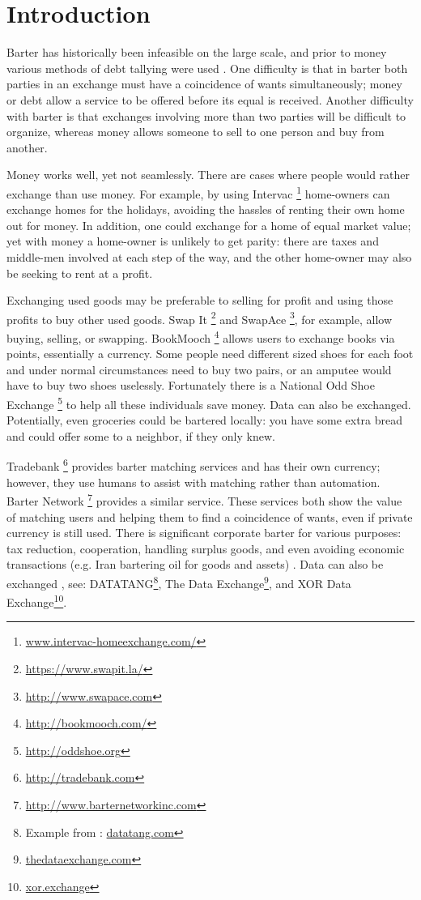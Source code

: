 \documentclass[main.tex]{subfiles}
\begin{document}
\section{Introduction}
Barter has historically been infeasible on the large scale, and prior to money various methods of debt tallying were used \cite{Gra1}. One difficulty is that in barter both parties in an exchange must have a coincidence of wants simultaneously; money or debt allow a service to be offered before its equal is received. Another difficulty with barter is that exchanges involving more than two parties will be difficult to organize, whereas money allows someone to sell to one person and buy from another.

Money works well, yet not seamlessly. There are cases where people would rather exchange than use money. For example, by using Intervac \footnote{\url{www.intervac-homeexchange.com/}} \cite{Abr1} home-owners can exchange homes for the holidays, avoiding the hassles of renting their own home out for money. In addition, one could exchange for a home of equal market value; yet with money a home-owner is unlikely to get parity: there are taxes and middle-men involved at each step of the way, and the other home-owner may also be seeking to rent at a profit.

Exchanging used goods may be preferable to selling for profit and using those profits to buy other used goods. Swap It \footnote{\url{https://www.swapit.la/}} and SwapAce \footnote{\url{http://www.swapace.com}}, for example, allow buying, selling, or swapping. BookMooch \footnote{\url{http://bookmooch.com/}} allows users to exchange books via points, essentially a currency. Some people need different sized shoes for each foot and under normal circumstances need to buy two pairs, or an amputee would have to buy two shoes uselessly. Fortunately there is a National Odd Shoe Exchange \footnote{\url{http://oddshoe.org}} to help all these individuals save money. Data can also be exchanged. Potentially, even groceries could be bartered locally: you have some extra bread and could offer some to a neighbor, if they only knew.

Tradebank \footnote{\url{http://tradebank.com}} provides barter matching services and has their own currency; however, they use humans to assist with matching rather than automation. Barter Network \footnote{\url{http://www.barternetworkinc.com}} provides a similar service. These services both show the value of matching users and helping them to find a coincidence of wants, even if private currency is still used. There is significant corporate barter for various purposes: tax reduction, cooperation, handling surplus goods, and even avoiding economic transactions (e.g. Iran bartering oil for goods and assets) \cite{art:str}. Data can also be exchanged \cite{art:blo}, see: DATATANG\footnote{Example from \cite{Fang}: \url{datatang.com}}, The Data Exchange\footnote{\url{thedataexchange.com}}, and XOR Data Exchange\footnote{\url{xor.exchange}}.
\end{document}
